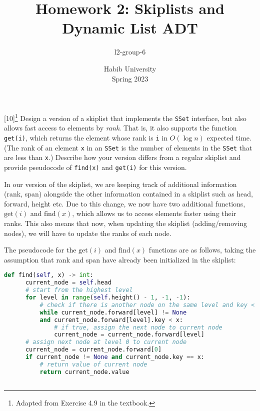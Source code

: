 \documentclass[addpoints]{exam}
\title{Homework 2: Skiplists and Dynamic List ADT}
\author{l2-group-6}  %
\date{Habib University\\Spring 2023}
\begin{document}
\begin{questions}

  [10]\footnote{Adapted from Exercise 4.9 in the textbook.}
  Design a version of a skiplist that implements the \texttt{SSet} interface, but also allows fast access to elements by \textit{rank}. That is, it also supports the function \texttt{get(i)}, which returns the element whose rank is \texttt{i} in $O(\log n)$ expected time. (The rank of an element \texttt{x} in an \texttt{SSet} is the number of elements in the \texttt{SSet} that are less than \texttt{x}.)
  Describe how your version differs from a regular skiplist and provide pseudocode of \texttt{find(x)} and \texttt{get(i)} for this version.
  \begin{solution}
    In our version of the skiplist, we are keeping track of additional information (rank, span) alongside the other information contained in a skiplist such as head, forward, height etc. Due to this change, we now have two additional functions, $\text{get}(i)$ and $\text{find}(x)$, which allows us to access elements faster using their ranks. This also means that now, when updating the skiplist (adding/removing nodes), we will have to update the ranks of each node.
    \par The pseudocode for the $\text{get}(i)$ and $\text{find}(x)$ functions are as follows, taking the assumption that rank and span have already been initialized in the skiplist:
    \begin{lstlisting}[language=Python]
    def find(self, x) -> int:
      current_node = self.head
      # start from the highest level
      for level in range(self.height() - 1, -1, -1):         
          # check if there is another node on the same level and key < x 
          while current_node.forward[level] != None           
          and current_node.forward[level].key < x:
              # if true, assign the next node to current node             
              current_node = current_node.forward[level]   
      # assign next node at level 0 to current node           
      current_node = current_node.forward[0]                  
      if current_node != None and current_node.key == x:
          # return value of current node
          return current_node.value                           
  

\end{lstlisting}
\end{solution}
\end{questions}
\end{document}

